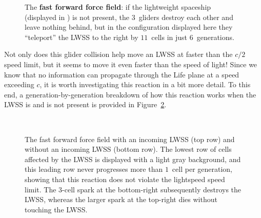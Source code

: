 \begin{figure}[!htb]
	\centering{}
	\caption{The \textbf{fast forward force field}: if the lightweight spaceship (displayed in ) is not present, the $3$~gliders destroy each other and leave nothing behind, but in the configuration displayed here they ``teleport'' the LWSS to the right by $11$~cells in just $6$~generations.}\label{fig:fast_forward_force_field}%
\end{figure}

Not only does this glider collision help move an LWSS at faster than the $c/2$ speed limit, but it seems to move it even faster than the speed of light! Since we know that no information can propagate through the Life plane at a speed exceeding $c$, it is worth investigating this reaction in a bit more detail. To this end, a generation-by-generation breakdown of how this reaction works when the LWSS is and is not present is provided in Figure~\ref{fig:ffff_analysis}.

\begin{figure}[!htb]
	\centering{}             \\[1.5em]
	
	            
	\caption{The fast forward force field with an incoming LWSS (top row) and without an incoming LWSS (bottom row). The lowest row of cells affected by the LWSS is displayed with a light gray background, and this leading row never progresses more than $1$~cell per generation, showing that this reaction does not violate the lightspeed speed limit. The $3$-cell spark at the bottom-right subsequently destroys the LWSS, whereas the larger spark at the top-right dies without touching the LWSS.}\label{fig:ffff_analysis}
\end{figure}

